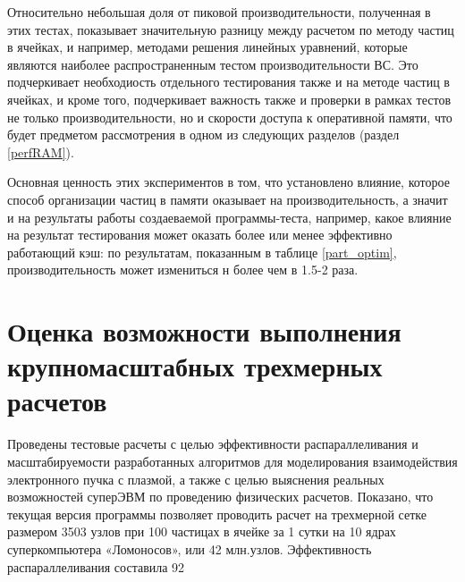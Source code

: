 Относительно небольшая доля от пиковой производительности, полученная в этих тестах, показывает значительную разницу между расчетом по методу частиц в ячейках, и например, методами решения линейных уравнений, которые являются наиболее распространенным тестом производительности ВС. Это подчеркивает необходиость отдельного тестирования также и на методе частиц в ячейках, и кроме того, подчеркивает важность также и проверки в рамках тестов не только производительности, но и скорости доступа к оперативной памяти, что будет предметом рассмотрения в одном из следующих разделов (раздел \ref{perfRAM}). 

Основная ценность этих экспериментов в том, что установлено влияние, которое способ организации частиц в памяти оказывает на производительность, а значит и на результаты работы создаеваемой программы-теста, например, какое влияние на результат тестирования может оказать более или менее эффективно работающий кэш: по результатам, показанным в таблице \ref{part_optim}, производительность может измениться н более чем в 1.5-2 раза.

\section{Оценка возможности выполнения крупномасштабных трехмерных расчетов}

Проведены тестовые расчеты с целью эффективности распараллеливания и масштабируемости разработанных алгоритмов для моделирования взаимодействия электронного пучка с плазмой, а также с целью выяснения реальных возможностей суперЭВМ по проведению физических расчетов. Показано, что текущая версия программы позволяет проводить расчет на трехмерной сетке размером 3503 узлов при 100 частицах в ячейке за 1 сутки на 10 ядрах суперкомпьютера «Ломоносов», или 42 млн.узлов. Эффективность распараллеливания составила 92 %















